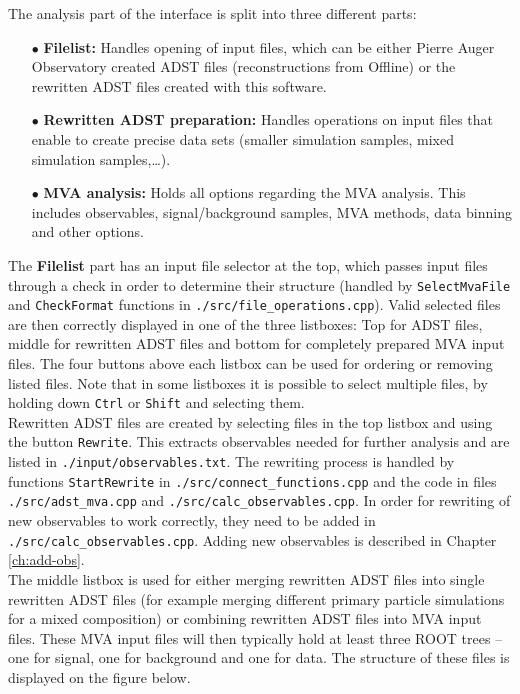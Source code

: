 \documentclass[12pt,a4paper]{report}
\begin{document}
{\noindent}The analysis part of the interface is split into three different parts:
\begin{itemize}
\item[$\bullet$] \textbf{Filelist:} Handles opening of input files, which can be either Pierre Auger Observatory created ADST files (reconstructions from Offline) or the rewritten ADST files created with this software.
\item[$\bullet$] \textbf{Rewritten ADST preparation:} Handles operations on input files that enable to create precise data sets (smaller simulation samples, mixed simulation samples,\dots).
\item[$\bullet$] \textbf{MVA analysis:} Holds all options regarding the MVA analysis. This includes observables, signal/background samples, MVA methods, data binning and other options.
\end{itemize}
The \textbf{Filelist} part has an input file selector at the top, which passes input files through a check in order to determine their structure (handled by \texttt{SelectMvaFile} and \texttt{CheckFormat} functions in \texttt{./src/file\_operations.cpp}). Valid selected files are then correctly displayed in one of the three listboxes: Top for ADST files, middle for rewritten ADST files and bottom for completely prepared MVA input files. The four buttons above each listbox can be used for ordering or removing listed files. Note that in some listboxes it is possible to select multiple files, by holding down \texttt{Ctrl} or \texttt{Shift} and selecting them.\\
Rewritten ADST files are created by selecting files in the top listbox and using the button \texttt{Rewrite}. This extracts observables needed for further analysis and are listed in \texttt{./input/observables.txt}. The rewriting process is handled by functions \texttt{StartRewrite} in \texttt{./src/connect\_functions.cpp} and the code in files \texttt{./src/adst\_mva.cpp} and \texttt{./src/calc\_observables.cpp}. In order for rewriting of new observables to work correctly, they need to be added in \linebreak\texttt{./src/calc\_observables.cpp}. Adding new observables is described in Chapter \ref{ch:add-obs}.\\
The middle listbox is used for either merging rewritten ADST files into single rewritten ADST files (for example merging different primary particle simulations for a mixed composition) or combining rewritten ADST files into MVA input files. These MVA input files will then typically hold at least three ROOT trees -- one for signal, one for background and one for data. The structure of these files is displayed on the figure below.
\end{document}
